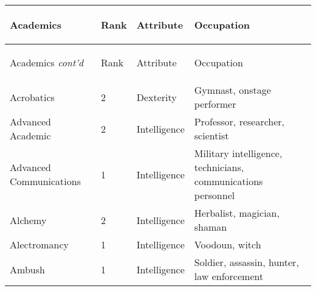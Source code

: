 \documentclass[twoside]{book}
\begin{document}
\begin{longtable}{p{1.25in}llp{12em}} 
  Academics
  &
  \begin{turn}{70}{Rank}\end{turn}
          
  &
  \begin{turn}{70}{Attribute}\end{turn}
          
  &
  \begin{turn}{70}{Occupation}\end{turn}
          
  \\
  \hline
  \hline
  \endfirsthead
  Academics \textit{cont'd}
        
  &
  \begin{turn}{70}{Rank}\end{turn}
          
  &
  \begin{turn}{70}{Attribute}\end{turn}
          
  &
  \begin{turn}{70}{Occupation}\end{turn}
          
  \\
  \endhead
      
  \raggedright
           Acrobatics 
  &
   2 
  &
   Dexterity 
  &
   Gymnast, onstage
           performer 
  \tabularnewline
  \hline
      
  \raggedright
           Advanced Academic 
  &
   2 
  &
   Intelligence 
  &
   Professor, researcher,
           scientist 
  \tabularnewline
  \hline
      
  \raggedright
           Advanced Communications
           
  &
   1 
  &
   Intelligence 
  &
   Military intelligence,
           technicians, communications personnel 
  \tabularnewline
  \hline
      
  \raggedright
           Alchemy 
  &
   2 
  &
   Intelligence 
  &
   Herbalist, magician,
           shaman 
  \tabularnewline
  \hline
      
  \raggedright
           Alectromancy 
  &
   1 
  &
   Intelligence 
  &
   Voodoun, witch 
  \tabularnewline
  \hline
      
  \raggedright
           Ambush 
  &
   1 
  &
   Intelligence 
  &
   Soldier, assassin,
           hunter, law enforcement 
  \tabularnewline
  \hline
      

\end{longtable}
\end{document}
